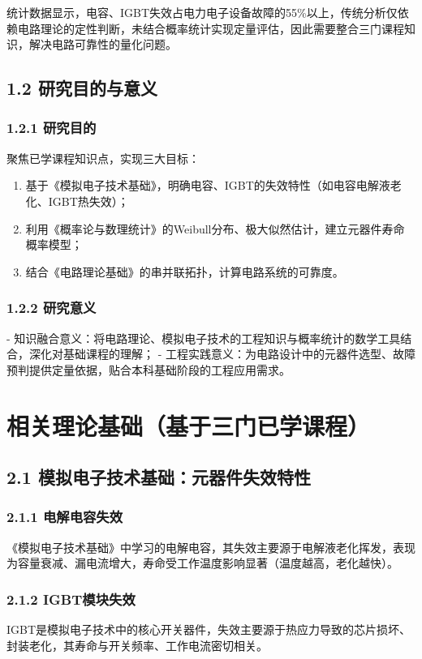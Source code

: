\documentclass{article}
\begin{document}
统计数据显示，电容、IGBT失效占电力电子设备故障的55\%以上\cite{reliability-stat}，传统分析仅依赖电路理论的定性判断，未结合概率统计实现定量评估，因此需要整合三门课程知识，解决电路可靠性的量化问题。

\subsection*{1.2 研究目的与意义}
\subsubsection*{1.2.1 研究目的}
聚焦已学课程知识点，实现三大目标：
\begin{enumerate}[label=(\arabic*)]
    \item 基于《模拟电子技术基础》，明确电容、IGBT的失效特性（如电容电解液老化、IGBT热失效）；
    \item 利用《概率论与数理统计》的Weibull分布、极大似然估计，建立元器件寿命概率模型；
    \item 结合《电路理论基础》的串并联拓扑，计算电路系统的可靠度。
\end{enumerate}

\subsubsection*{1.2.2 研究意义}
- 知识融合意义：将电路理论、模拟电子技术的工程知识与概率统计的数学工具结合，深化对基础课程的理解；
- 工程实践意义：为电路设计中的元器件选型、故障预判提供定量依据，贴合本科基础阶段的工程应用需求。


\section*{相关理论基础（基于三门已学课程）}
\subsection*{2.1 模拟电子技术基础：元器件失效特性}
\subsubsection*{2.1.1 电解电容失效}
《模拟电子技术基础》中学习的电解电容，其失效主要源于电解液老化挥发，表现为容量衰减、漏电流增大，寿命受工作温度影响显著（温度越高，老化越快）。

\subsubsection*{2.1.2 IGBT模块失效}
IGBT是模拟电子技术中的核心开关器件，失效主要源于热应力导致的芯片损坏、封装老化，其寿命与开关频率、工作电流密切相关。
\end{document}
